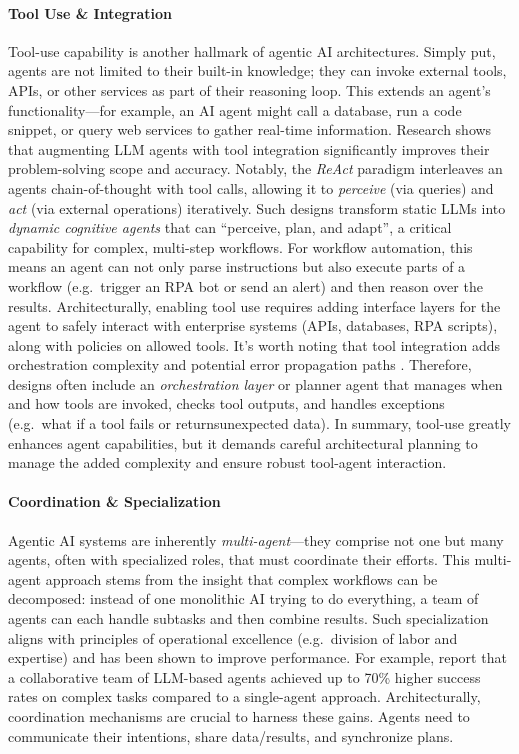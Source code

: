 \paragraph{Tool Use \& Integration} Tool-use capability is another hallmark of agentic AI architectures. Simply put, agents are not limited to their built-in knowledge; they can invoke external tools, APIs, or other services as part of their reasoning loop. This extends an agent's functionality---for example, an AI agent might call a database, run a code snippet, or query web services to gather real-time information. Research shows that augmenting LLM agents with tool integration significantly improves their problem-solving scope and accuracy. Notably, the \emph{ReAct} paradigm interleaves an agents chain-of-thought with tool calls, allowing it to \emph{perceive} (via queries) and \emph{act} (via external operations) iteratively. Such designs transform static LLMs into \emph{dynamic cognitive agents} that can “perceive, plan, and adapt”, a critical capability for complex, multi-step workflows. For workflow automation, this means an agent can not only parse instructions but also execute parts of a workflow (e.g.~trigger an RPA bot or send an alert) and then reason over the results. Architecturally, enabling tool use requires adding interface layers for the agent to safely interact with enterprise systems (APIs, databases, RPA scripts), along with policies on allowed tools. It's worth noting that tool integration adds orchestration complexity and potential error propagation paths \parencite{sapkotaAI2026}. Therefore, designs often include an \emph{orchestration layer} or planner agent that manages when and how tools are invoked, checks tool outputs, and handles exceptions (e.g.~what if a tool fails or returnsunexpected data). In summary, tool-use greatly enhances agent capabilities, but it demands careful architectural planning to manage the added complexity and ensure robust tool-agent interaction. 

\paragraph{Coordination \& Specialization} Agentic AI systems are inherently \emph{multi-agent}---they comprise not one but many agents, often with specialized roles, that must coordinate their efforts. This multi-agent approach stems from the insight that complex workflows can be decomposed: instead of one monolithic AI trying to do everything, a team of agents can each handle subtasks and then combine results. Such specialization aligns with principles of operational excellence (e.g.~division of labor and expertise) and has been shown to improve performance. For example, \textcite{shuEffective2024} report that a collaborative team of LLM-based agents achieved up to 70\% higher success rates on complex tasks compared to a single-agent approach. Architecturally, coordination mechanisms are crucial to harness these gains. Agents need to communicate their intentions, share data/results, and synchronize plans.

